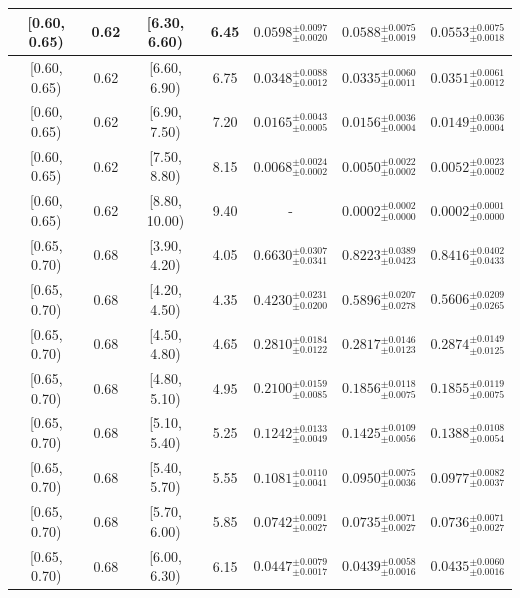 \begin{longtable}{|c|c|c|c|c|c|c|}
[0.60, 0.65) & 0.62 & [6.30, 6.60) & 6.45 & $0.0598^{ \pm 0.0097 }_{ \pm 0.0020 }$ & $0.0588^{ \pm 0.0075 }_{ \pm 0.0019 }$ & $0.0553^{ \pm 0.0075 }_{ \pm 0.0018 }$ \\ 
\hline
[0.60, 0.65) & 0.62 & [6.60, 6.90) & 6.75 & $0.0348^{ \pm 0.0088 }_{ \pm 0.0012 }$ & $0.0335^{ \pm 0.0060 }_{ \pm 0.0011 }$ & $0.0351^{ \pm 0.0061 }_{ \pm 0.0012 }$ \\ 
\hline
[0.60, 0.65) & 0.62 & [6.90, 7.50) & 7.20 & $0.0165^{ \pm 0.0043 }_{ \pm 0.0005 }$ & $0.0156^{ \pm 0.0036 }_{ \pm 0.0004 }$ & $0.0149^{ \pm 0.0036 }_{ \pm 0.0004 }$ \\ 
\hline
[0.60, 0.65) & 0.62 & [7.50, 8.80) & 8.15 & $0.0068^{ \pm 0.0024 }_{ \pm 0.0002 }$ & $0.0050^{ \pm 0.0022 }_{ \pm 0.0002 }$ & $0.0052^{ \pm 0.0023 }_{ \pm 0.0002 }$ \\ 
\hline
[0.60, 0.65) & 0.62 & [8.80, 10.00) & 9.40 & - & $0.0002^{ \pm 0.0002 }_{ \pm 0.0000 }$ & $0.0002^{ \pm 0.0001 }_{ \pm 0.0000 }$ \\ 
\hline
[0.65, 0.70) & 0.68 & [3.90, 4.20) & 4.05 & $0.6630^{ \pm 0.0307 }_{ \pm 0.0341 }$ & $0.8223^{ \pm 0.0389 }_{ \pm 0.0423 }$ & $0.8416^{ \pm 0.0402 }_{ \pm 0.0433 }$ \\ 
\hline
[0.65, 0.70) & 0.68 & [4.20, 4.50) & 4.35 & $0.4230^{ \pm 0.0231 }_{ \pm 0.0200 }$ & $0.5896^{ \pm 0.0207 }_{ \pm 0.0278 }$ & $0.5606^{ \pm 0.0209 }_{ \pm 0.0265 }$ \\ 
\hline
[0.65, 0.70) & 0.68 & [4.50, 4.80) & 4.65 & $0.2810^{ \pm 0.0184 }_{ \pm 0.0122 }$ & $0.2817^{ \pm 0.0146 }_{ \pm 0.0123 }$ & $0.2874^{ \pm 0.0149 }_{ \pm 0.0125 }$ \\ 
\hline
[0.65, 0.70) & 0.68 & [4.80, 5.10) & 4.95 & $0.2100^{ \pm 0.0159 }_{ \pm 0.0085 }$ & $0.1856^{ \pm 0.0118 }_{ \pm 0.0075 }$ & $0.1855^{ \pm 0.0119 }_{ \pm 0.0075 }$ \\ 
\hline
[0.65, 0.70) & 0.68 & [5.10, 5.40) & 5.25 & $0.1242^{ \pm 0.0133 }_{ \pm 0.0049 }$ & $0.1425^{ \pm 0.0109 }_{ \pm 0.0056 }$ & $0.1388^{ \pm 0.0108 }_{ \pm 0.0054 }$ \\ 
\hline
[0.65, 0.70) & 0.68 & [5.40, 5.70) & 5.55 & $0.1081^{ \pm 0.0110 }_{ \pm 0.0041 }$ & $0.0950^{ \pm 0.0075 }_{ \pm 0.0036 }$ & $0.0977^{ \pm 0.0082 }_{ \pm 0.0037 }$ \\ 
\hline
[0.65, 0.70) & 0.68 & [5.70, 6.00) & 5.85 & $0.0742^{ \pm 0.0091 }_{ \pm 0.0027 }$ & $0.0735^{ \pm 0.0071 }_{ \pm 0.0027 }$ & $0.0736^{ \pm 0.0071 }_{ \pm 0.0027 }$ \\ 
\hline
[0.65, 0.70) & 0.68 & [6.00, 6.30) & 6.15 & $0.0447^{ \pm 0.0079 }_{ \pm 0.0017 }$ & $0.0439^{ \pm 0.0058 }_{ \pm 0.0016 }$ & $0.0435^{ \pm 0.0060 }_{ \pm 0.0016 }$ \\ 

\end{longtable}
